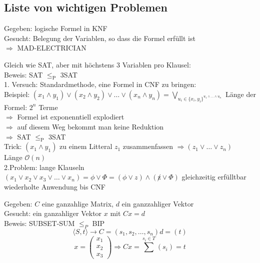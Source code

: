 \documentclass[a4paper]{article}
\begin{document}
\subsection{Liste von wichtigen Problemen}
	\begin{multicols}{2}	
	
	\begin{fspec}
	Gegeben: logische Formel in KNF \\
	Gesucht: Belegung der Variablen, so dass die Formel erfüllt ist \\
	$\Rightarrow$ MAD-ELECTRICIAN
	\end{fspec}
	
    \begin{fspec}[3SAT]
	Gleich wie SAT, aber mit höchstens 3 Variablen pro Klausel: \\

	Beweis: SAT $\leq_{\text{P}}$ 3SAT \\
	1. Versuch: Standardmethode, eine Formel in CNF zu bringen: \\
		Beispiel: $(x_1 \wedge y_1) \vee (x_2 \wedge y_2) \vee \dots \vee (x_n \wedge y_n) = \bigvee_{u_i \in \{x_i, y_i \}^{u_1 \wedge \dots \wedge u_n} }$
		Länge der Formel: $2^n$ Terme \\
		$\Rightarrow$ Formel ist exponenntiell explodiert \\
		$\Rightarrow$ auf diesem Weg bekommt man keine Reduktion \\
		$\Rightarrow$ SAT $\leq_{\text{P}}$ 3SAT \\
		Trick: $(x_1 \wedge y_1)$ zu einem Litteral $z_1$ zusammenfassen $\Rightarrow (z_1 \vee \dots \vee z_n)$ \\ Länge $\mathcal{O}(n)$
		\\
	2.Problem: lange Klauseln $(x_1 \vee x_2 \vee x_3 \vee \dots \vee x_n) = \phi \vee \Phi = (\phi \vee z) \wedge (\not z \vee \Phi)$ gleichzeitig erfülltbar \\
	wiederholte Anwendung bis CNF 
	\end{fspec}
	
	\begin{fspec}
	Gegeben: $C$ eine ganzahlige Matrix, $d$ ein ganzzahliger Vektor \\
	Gesucht: ein ganzahliger Vektor $x$ mit $Cx = d$ \\
	\hspace{2mm}
	Beweis: SUBSET-SUM $\leq_P$ BIP
	$$\langle S,t \rangle \rightarrow C=(s_1,s_2, \dots , s_n) d= (t) $$
	$$ x = \begin{pmatrix} x_1 \\ x_2 \\ x_3\end{pmatrix} \Rightarrow Cx = \sum\limits_{}^{s_i \in T}(s_i) = t$$
	\end{fspec}
	

\end{multicols}
\end{document}
